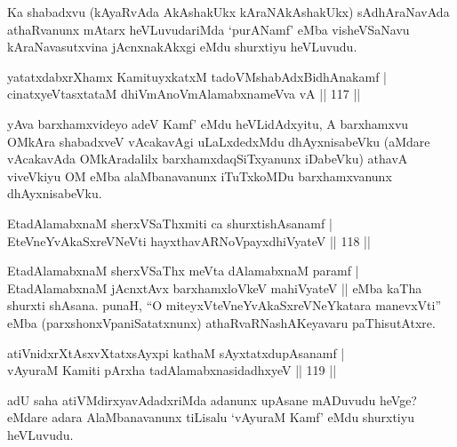 \begin{artha}
Ka shabadxvu (kAyaRvAda AkAshakUkx kAraNAkAshakUkx) sAdhAraNavAda athaRvanunx mAtarx heVLuvudariMda `purANamf' eMba visheVSaNavu kAraNavasutxvina jAcnxnakAkxgi eMdu shurxtiyu heVLuvudu.
\end{artha}


\begin{shl}
yatatxdabxrXhamx KamituyxkatxM tadoVMshabAdxBidhAnakamf  | \\
cinatxyeVtasxtataM dhiVmAnoVmAlamabxnameVva vA \hfill||  117 ||  
\end{shl}

\begin{artha}
yAva barxhamxvideyo adeV Kamf' eMdu heVLidAdxyitu, A barxhamxvu OMkAra shabadxveV vAcakavAgi uLaLxdedxMdu dhAyxnisabeVku (aMdare vAcakavAda OMkAradalilx barxhamxdaqSiTxyanunx iDabeVku) athavA viveVkiyu OM eMba alaMbanavanunx iTuTxkoMDu barxhamxvanunx dhAyxnisabeVku.
\end{artha}


\begin{shl}
EtadAlamabxnaM sherxVSaThxmiti ca shurxtishAsanamf  | \\
EteVneYvAkaSxreVNeVti hayxthavARNoV\s payxdhiVyateV \hfill||  118 ||  
\end{shl}

\begin{artha}
EtadAlamabxnaM sherxVSaThx meVta dAlamabxnaM paramf | EtadAlamabxnaM jAcnxtAvx barxhamxloVkeV mahiVyateV || eMba kaTha shurxti shAsana. punaH, ``O miteyxVteVneYvAkaSxreVNeYkatara manevxVti'' eMba (parxshonxVpaniSatatxnunx) athaRvaRNashAKeyavaru paThisutAtxre.
\end{artha}


\begin{shl}
atiVnidxrXtAsxvXtatxsAyxpi kathaM sAyxtatxdupAsanamf   | \\
vAyuraM Kamiti pArxha tadAlamabxnasidadhxyeV \hfill||  119 ||  
\end{shl}

\begin{artha}
adU saha atiVMdirxyavAdadxriMda adanunx upAsane mADuvudu heVge? eMdare adara AlaMbanavanunx tiLisalu `vAyuraM Kamf' eMdu shurxtiyu heVLuvudu.
\end{artha}

